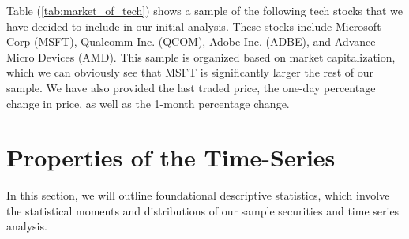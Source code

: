 \documentclass[12pt]{article}
\begin{document}
Table (\ref{tab:market_of_tech}) shows a sample of the following tech stocks that we have decided to include in our initial analysis. These stocks include Microsoft Corp (MSFT), Qualcomm Inc. (QCOM), Adobe Inc. (ADBE), and Advance Micro Devices (AMD). This sample is organized based on market capitalization, which we can obviously see that MSFT is significantly larger the rest of our sample. We have also provided the last traded price, the one-day percentage change in price, as well as the 1-month percentage change.

\section{Properties of the Time-Series}

In this section, we will outline foundational descriptive statistics, which involve the statistical moments and distributions of our sample securities and time series analysis.
\end{document}
